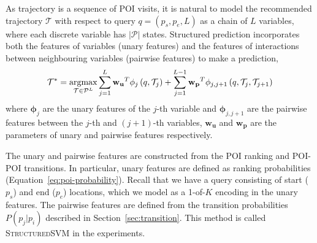 {As trajectory is a sequence of POI visits,
it is natural to model the recommended trajectory $\mathcal{T}$ with respect to query $q = (p_s, p_e, L)$
as a chain of $L$ variables, where each discrete variable has $|\mathcal{P}|$ states.
Structured prediction incorporates both the features of variables (unary features) and
the features of interactions between neighbouring variables (pairwise features) to make a
prediction,
\begin{displaymath}
    \mathcal{T}^* = \operatorname*{argmax}_{\mathcal{T} \in \mathcal{P}^L}
                    \sum_{j=1}^L \mathbf{w_u}^T \mathbf{\phi}_j \left( q, \mathcal{T}_j \right) +
                    \sum_{j=1}^{L-1} \mathbf{w_p}^T \mathbf{\phi}_{j, j+1} \left( q, \mathcal{T}_j, \mathcal{T}_{j+1} \right)
\end{displaymath}
where $\mathbf{\phi}_j$ are the unary features of the $j$-th variable and $\mathbf{\phi}_{j, j+1}$ are the pairwise features between
the $j$-th and $(j+1)$-th variables, $\mathbf{w_u}$ and $\mathbf{w_p}$ are the
parameters of unary and pairwise features respectively.

The unary and pairwise features are constructed from the POI ranking and POI-POI transitions.
In particular, unary features are defined as ranking probabilities (Equation~\ref{eq:poi-probability}).
Recall that we have a query consisting of start ($p_s$) and end ($p_e$) locations, which
we model as a 1-of-$K$ encoding in the unary features.
The pairwise features are defined from the transition probabilities $P(p_j | p_i)$ described in
Section~\ref{sec:transition}.
This method is called \textsc{StructuredSVM} in the experiments.

}
